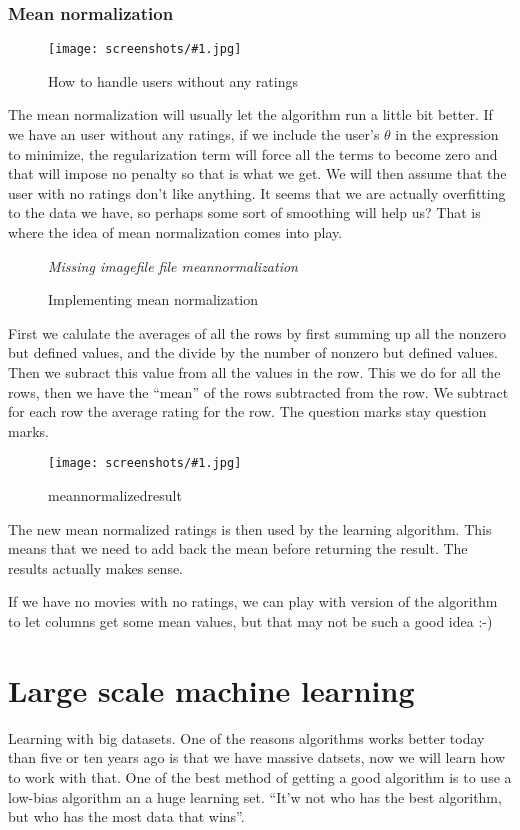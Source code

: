 \documentclass[a4, 12pt, english, USenglish]{scrreprt}
\newcommand{\xscreenshot}[2]{
\begin{figure}[htb]
\begin{center}
\em Missing imagefile file #1
\end{center}
\label{#1}
\caption{#2}
\end{figure}}
\newcommand{\screenshot}[2]{
\begin{figure}[htb]
\texttt{[image: screenshots/\#1.jpg]}
\label{#1}
\caption{#2}
\end{figure}}
\begin{document}
\subsection{Mean normalization}

\screenshot{userswithoutrating}{How to handle users without any ratings}

The mean normalization will usually let the algorithm run a little bit
better.  If we have an user without any ratings, if we include the
user's \(\theta\) in the expression to minimize, the regularization
term will force all the terms to become zero and that will impose no
penalty so that is what we get.  We will then assume that the user
with no ratings don't like anything.  It seems that we are actually
overfitting to the data we have, so perhaps some sort of smoothing
will help us?  That is where the idea of mean normalization comes into
play.


\xscreenshot{meannormalization}{Implementing mean normalization}

First we calulate the averages of all the rows by first summing up all
the nonzero but defined values, and the divide by the number of
nonzero but defined values.  Then we subract this value from all the
values in the row.  This we do for all the rows, then we have the
``mean'' of the rows subtracted from the row.  We subtract for each
row the average rating for the row.  The question marks stay question
marks.

\screenshot{meannormalizedresult}{meannormalizedresult}

The new mean normalized ratings is then used by the learning
algorithm. This means that we need to add back the mean before
returning the result.  The results actually makes sense.

If we have no movies with no ratings, we can play with version of
the algorithm to let columns get some mean values, but that may not be
such a good idea :-)

\chapter{Large scale machine learning}

Learning with big datasets.  One of the reasons algorithms works
better today than five or ten years ago is that we have massive
datsets, now we will learn how to work with that.  One of the best
method of getting a good algorithm is to use a low-bias algorithm an a
huge learning set.  ``It'w not who has the best algorithm, but who has
the most data that wins''.   
\end{document}
